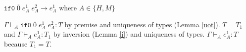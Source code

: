 \begin{case}
$\mathtt{if0}\;\overline{0}\;e_{A}^{1}\;e_{A}^{2}\rightarrow e_{A}^{1}$ where $A\in\lbrace H,M\rbrace$

$\Gamma\vdash_{A}\mathtt{if0}\;\overline{0}\;e_{A}^{1}\;e_{A}^{2}:T$ by premise and uniqueness of types (Lemma \ref{uot}).  $T=T_{1}$ and $\Gamma\vdash_{A}e_{A}^{1}:T_{1}$ by inversion (Lemma \ref{i}) and uniqueness of types.  $\Gamma\vdash_{A}e_{A}^{1}:T$ because $T_{1}=T$.
\end{case}